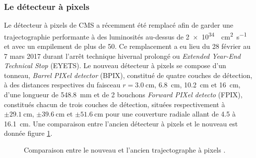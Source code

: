 \subsubsection{Le détecteur à pixels}
Le détecteur à pixels de CMS a récemment été remplacé afin de garder une trajectographie performante à des luminosités au-dessus de \SI{2e34}{\per\square\centi\meter\per\second} et avec un empilement de plus de \num{50}. Ce remplacement a eu lieu du \num{28} février au \num{7} mars \num{2017} durant l'arrêt technique hivernal prolongé ou \textit{Extended Year-End Technical Stop} (EYETS). Le nouveau détecteur à pixels se compose d'un tonneau, \textit{Barrel PIXel detector} (BPIX), constitué de quatre couches de détection, à des distances respectives du faisceau $r=\SI{3.0}{\centi\meter}$, \SI{6.8}{\centi\meter}, \SI{10.2}{\centi\meter} et \SI{16}{\centi\meter}, d'une longueur de \SI{548.8}{\milli\meter} et de 2 bouchons \textit{Forward PIXel detecto} (FPIX), constitués chacun de trois couches de détection, situées respectivement à $\pm\SI{29.1}{\centi\meter}$, $\pm\SI{39.6}{\centi\meter}$ et $\pm\SI{51.6}{\centi\meter}$ pour une couverture radiale allant de \num{4.5} à \SI{16.1}{\centi\meter}. Une comparaison entre l'ancien détecteur à pixels et le nouveau est donnée figure \ref{pixel}.

	\begin{figure}[ht!]
	\hfill
	\caption{Comparaison entre le nouveau et l'ancien trajectographe à pixels \cite{Dominguez:1481838}.}
	\label{pixel}
\end{figure}

